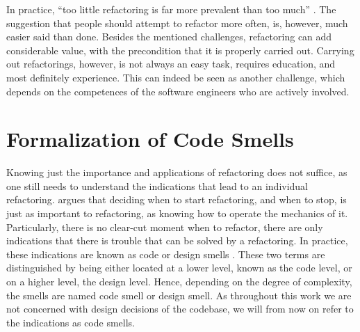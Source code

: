 In practice, 
	“too little refactoring is far more prevalent than too much” 
	\cite[p.56]{fowler2018}.
The suggestion that people should attempt to refactor more often, 
	is, however, much easier said than done.
Besides the mentioned challenges, 
	refactoring can add considerable value, 
	with the precondition that it is properly carried out.
Carrying out refactorings, however, is not always an easy task, 
	requires education, and most definitely experience.
This can indeed be seen as another challenge, 
	which depends on the competences of the software engineers who are actively involved.





\section{Formalization of Code Smells}

Knowing just the importance and applications of refactoring does not suffice, 
	as one still needs to understand the indications 
	that lead to an individual refactoring.
\textcite{fowler2018} argues that deciding when to start refactoring,
	and when to stop,
	is just as important to refactoring,
	as knowing how to operate the mechanics of it.
Particularly, there is no clear-cut moment when to refactor, 
	there are only indications 
	that there is trouble that can be solved by a refactoring.
In practice, 
	these indications are known as code or design smells 
	\cite[p.~2]{lacerda2020}.
These two terms are distinguished by being either located at a lower level,
	known as the code level, or on a higher level, 
	the design level. 
Hence, 
	depending on the degree of complexity, 
	the smells are named code smell or design smell.
As throughout this work we are not concerned 
	with design decisions of the codebase, 
	we will from now on refer to the indications as code smells.

